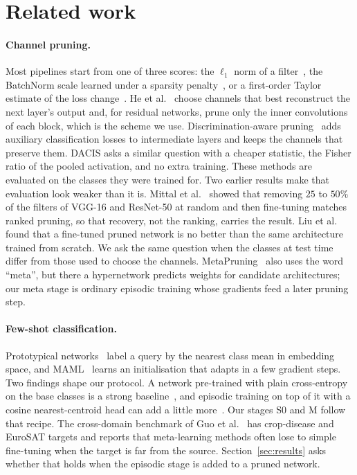 \section{Related work}
\label{sec:related}

\paragraph{Channel pruning.}
Most pipelines start from one of three scores: the $\ell_1$ norm of a filter~\cite{li2017pruning}, the BatchNorm scale learned under a sparsity penalty~\cite{liu2017slimming}, or a first-order Taylor estimate of the loss change~\cite{molchanov2017pruning,molchanov2019importance}. He et al.~\cite{he2017channel} choose channels that best reconstruct the next layer's output and, for residual networks, prune only the inner convolutions of each block, which is the scheme we use. Discrimination-aware pruning~\cite{zhuang2018dcp} adds auxiliary classification losses to intermediate layers and keeps the channels that preserve them. DACIS asks a similar question with a cheaper statistic, the Fisher ratio of the pooled activation, and no extra training. These methods are evaluated on the classes they were trained for. Two earlier results make that evaluation look weaker than it is. Mittal et al.~\cite{mittal2018recovering} showed that removing $25$ to $50\%$ of the filters of VGG-16 and ResNet-50 at random and then fine-tuning matches ranked pruning, so that recovery, not the ranking, carries the result. Liu et al.~\cite{liu2019rethinking} found that a fine-tuned pruned network is no better than the same architecture trained from scratch. We ask the same question when the classes at test time differ from those used to choose the channels. MetaPruning~\cite{liu2019metapruning} also uses the word ``meta'', but there a hypernetwork predicts weights for candidate architectures; our meta stage is ordinary episodic training whose gradients feed a later pruning step.

\paragraph{Few-shot classification.}
Prototypical networks~\cite{snell2017proto} label a query by the nearest class mean in embedding space, and MAML~\cite{finn2017maml} learns an initialisation that adapts in a few gradient steps. Two findings shape our protocol. A network pre-trained with plain cross-entropy on the base classes is a strong baseline~\cite{chen2019closer,tian2020rethinking}, and episodic training on top of it with a cosine nearest-centroid head can add a little more~\cite{chen2021metabaseline}. Our stages S0 and M follow that recipe. The cross-domain benchmark of Guo et al.~\cite{guo2020bscd} has crop-disease and EuroSAT targets and reports that meta-learning methods often lose to simple fine-tuning when the target is far from the source. Section~\ref{sec:results} asks whether that holds when the episodic stage is added to a pruned network.

